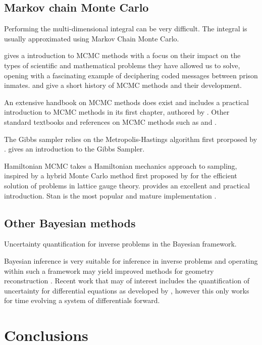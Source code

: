 \subsection{Markov chain Monte Carlo}
Performing the multi-dimensional integral can be very difficult. The integral is usually approximated using Markov Chain Monte Carlo.

\citet{Diaconis09} gives a introduction to MCMC methods with a focus on their impact on the types of scientific and mathematical problems they have allowed us to solve, opening with a fascinating example of deciphering coded messages between prison inmates. \citet{Richey10} and \citet{Robert11} give a short history of MCMC methods and their development. 

An extensive handbook on MCMC methods does exist \citep{Brooks11} and includes a practical introduction to MCMC methods in its first chapter, authored by \citet{Geyer11}. Other standard textbooks and references on MCMC methods such as \citet{Gilks95} and \citet{Christian99}.


The Gibbs sampler relies on the Metropolis-Hastings algorithm first prorposed by \citet{Metropolis53}. \citet{Casella92} gives an introduction to the Gibbs Sampler.

Hamiltonian MCMC takes a Hamiltonian mechanics approach to sampling, inspired by a hybrid Monte Carlo method first proposed by \citet{Duane87} for the efficient solution of problems in lattice gauge theory. \citet{Neal11} provides an excellent and practical introduction. Stan is the most popular and mature implementation \citet{Carpenter17}.

\subsection{Other Bayesian methods}
Uncertainty quantification for inverse problems in the Bayesian framework.

Bayesian inference is very suitable for inference in inverse problems and operating within such a framework may yield improved methods for geometry reconstruction \citet{Stuart10}. Recent work that may of interest includes the quantification of uncertainty for differential equations as developed by \citet{Chkrebtii16}, however this only works for time evolving a system of differentials forward.



\section{Conclusions}